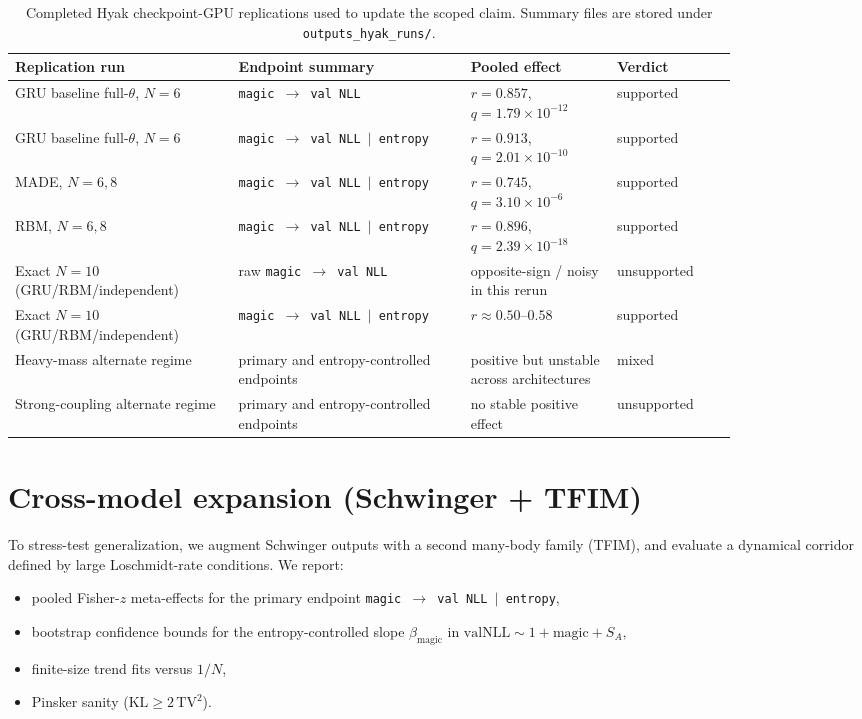 \documentclass[11pt]{article}
\begin{document}
\begin{table}[tbp]
\centering
\small
\begin{tabular}{p{0.26\linewidth}p{0.27\linewidth}p{0.17\linewidth}p{0.14\linewidth}}
\toprule
Replication run & Endpoint summary & Pooled effect & Verdict \\
\midrule
GRU baseline full-$\theta$, $N=6$ & \texttt{magic $\rightarrow$ val NLL} & $r=0.857$, $q=1.79\times 10^{-12}$ & supported \\
GRU baseline full-$\theta$, $N=6$ & \texttt{magic $\rightarrow$ val NLL $|$ entropy} & $r=0.913$, $q=2.01\times 10^{-10}$ & supported \\
MADE, $N=6,8$ & \texttt{magic $\rightarrow$ val NLL $|$ entropy} & $r=0.745$, $q=3.10\times 10^{-6}$ & supported \\
RBM, $N=6,8$ & \texttt{magic $\rightarrow$ val NLL $|$ entropy} & $r=0.896$, $q=2.39\times 10^{-18}$ & supported \\
Exact $N=10$ (GRU/RBM/independent) & raw \texttt{magic $\rightarrow$ val NLL} & opposite-sign / noisy in this rerun & unsupported \\
Exact $N=10$ (GRU/RBM/independent) & \texttt{magic $\rightarrow$ val NLL $|$ entropy} & $r\approx 0.50$--$0.58$ & supported \\
Heavy-mass alternate regime & primary and entropy-controlled endpoints & positive but unstable across architectures & mixed \\
Strong-coupling alternate regime & primary and entropy-controlled endpoints & no stable positive effect & unsupported \\
\bottomrule
\end{tabular}
\caption{Completed Hyak checkpoint-GPU replications used to update the scoped claim. Summary files are stored under \texttt{outputs\_hyak\_runs/}.}
\end{table}

\section{Cross-model expansion (Schwinger + TFIM)}
To stress-test generalization, we augment Schwinger outputs with a second many-body family (TFIM), and evaluate a dynamical corridor defined by large Loschmidt-rate conditions. We report:
\begin{itemize}
    \item pooled Fisher-$z$ meta-effects for the primary endpoint \texttt{magic $\rightarrow$ val NLL $|$ entropy},
    \item bootstrap confidence bounds for the entropy-controlled slope $\beta_\mathrm{magic}$ in
    \(
    \mathrm{valNLL}\sim 1+\mathrm{magic}+S_A,
    \)
    \item finite-size trend fits versus $1/N$,
    \item Pinsker sanity (\( \mathrm{KL}\ge 2\,\mathrm{TV}^2\)).
\end{itemize}
\end{document}
